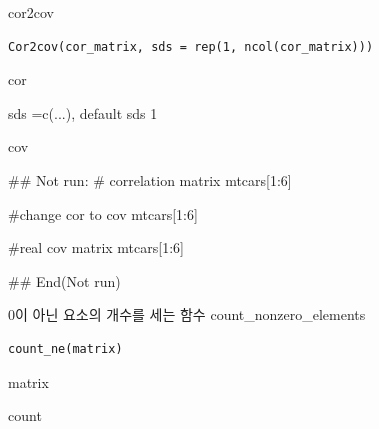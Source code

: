 \documentclass[a4paper]{book}
\begin{document}
%
\begin{Description}
cor2cov
\end{Description}
%
\begin{Usage}
\begin{verbatim}
Cor2cov(cor_matrix, sds = rep(1, ncol(cor_matrix)))
\end{verbatim}
\end{Usage}
%
\begin{Arguments}
\begin{ldescription}
\item[\code{cor\_matrix}] cor

\item[\code{sds}] sds =c(...), default sds 1
\end{ldescription}
\end{Arguments}
%
\begin{Value}
cov
\end{Value}
%
\begin{Examples}
\begin{ExampleCode}

\#\# Not run: 
# correlation matrix
mtcars[1:6] %

#change cor to cov
mtcars[1:6] %

#real cov matrix
mtcars[1:6] %


## End(Not run)


\end{ExampleCode}
\end{Examples}
%
\begin{Description}
0이 아닌 요소의 개수를 세는 함수 count\_nonzero\_elements
\end{Description}
%
\begin{Usage}
\begin{verbatim}
count_ne(matrix)
\end{verbatim}
\end{Usage}
%
\begin{Arguments}
\begin{ldescription}
\item[\code{matrix}] matrix
\end{ldescription}
\end{Arguments}
%
\begin{Value}
count
\end{Value}
%
\end{document}
